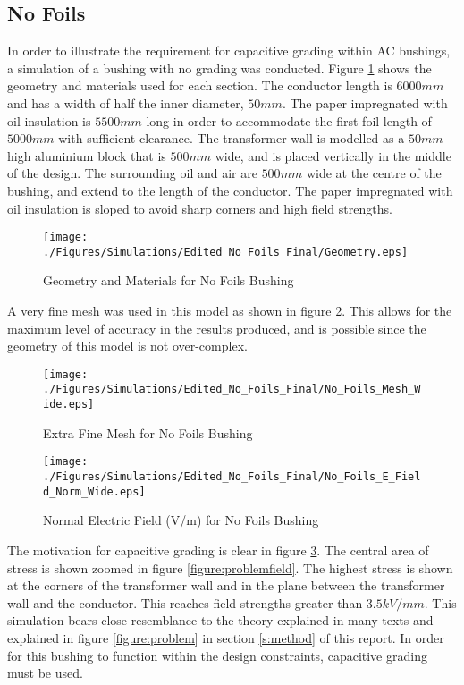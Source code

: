 \subsection{No Foils}
In order to illustrate the requirement for capacitive grading within AC bushings, a simulation of a bushing with no grading was conducted.
Figure \ref{Figure:No_Foil_Geom} shows the geometry and materials used for each section.
The conductor length is $6000mm$ and has a width of half the inner diameter, $50mm$. 
The paper impregnated with oil insulation is $5500mm$ long in order to accommodate the first foil length of $5000mm$ with sufficient clearance. 
The transformer wall is modelled as a $50mm$ high aluminium block that is $500mm$ wide, and is placed vertically in the middle of the design. The surrounding oil and air are $500mm$ wide at the centre of the bushing, and extend to the length of the conductor.
The paper impregnated with oil insulation is sloped to avoid sharp corners and high field strengths.
\begin{figure}[!h]
  \centering
    \texttt{[image: ./Figures/Simulations/Edited\_No\_Foils\_Final/Geometry.eps]} 
	\caption{Geometry and Materials for No Foils Bushing}
\label{Figure:No_Foil_Geom}
\end{figure}


A very fine mesh was used in this model as shown in figure \ref{Figure:No_Foil_Mesh}. This allows for the maximum level of accuracy in the results produced, and is possible since the geometry of this model is not over-complex.
\begin{figure}[!h]
  \centering
    \texttt{[image: ./Figures/Simulations/Edited\_No\_Foils\_Final/No\_Foils\_Mesh\_Wide.eps]} 
	\caption{Extra Fine Mesh for No Foils Bushing}
\label{Figure:No_Foil_Mesh}
\end{figure}


\begin{figure}[!h]
  \centering
    \texttt{[image: ./Figures/Simulations/Edited\_No\_Foils\_Final/No\_Foils\_E\_Field\_Norm\_Wide.eps]} 
	\caption{Normal Electric Field (V/m) for No Foils Bushing}
\label{Figure:No_Foil_Field}
\end{figure}


The motivation for capacitive grading is clear in figure \ref{Figure:No_Foil_Field}. 
The central area of stress is shown zoomed in figure \ref{figure:problemfield}.
The highest stress is shown at the corners of the transformer wall and in the plane between the transformer wall and the conductor.
This reaches field strengths greater than $3.5kV/mm$.
This simulation bears close resemblance to the theory explained in many texts and explained in figure \ref{figure:problem} in section \ref{s:method} of this report.
In order for this bushing to function within the design constraints, capacitive grading must be used.

